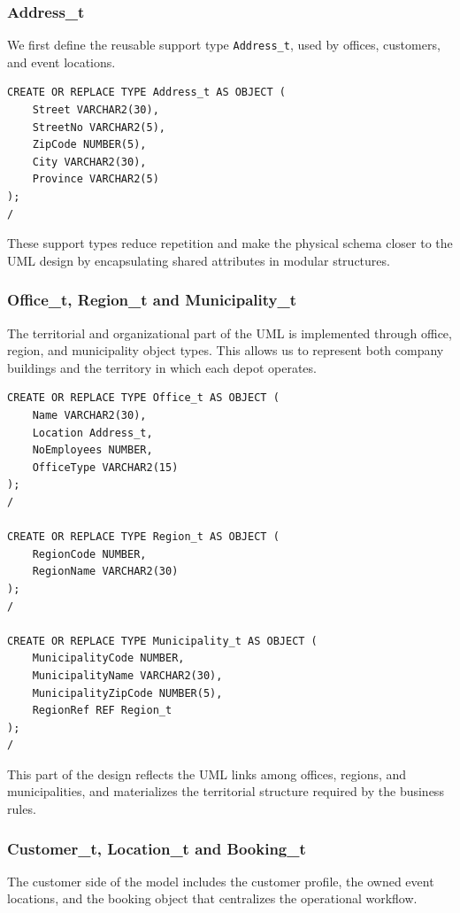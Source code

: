 \documentclass[12pt,a4paper]{article}
\begin{document}
\subsubsection*{Address\_t}
We first define the reusable support type \texttt{Address\_t}, used by offices, customers, and event locations.

\begin{verbatim}
CREATE OR REPLACE TYPE Address_t AS OBJECT (
    Street VARCHAR2(30),
    StreetNo VARCHAR2(5),
    ZipCode NUMBER(5),
    City VARCHAR2(30),
    Province VARCHAR2(5)
);
/
\end{verbatim}

These support types reduce repetition and make the physical schema closer to the UML design by encapsulating shared attributes in modular structures.

\subsubsection*{Office\_t, Region\_t and Municipality\_t}
The territorial and organizational part of the UML is implemented through office, region, and municipality object types. This allows us to represent both company buildings and the territory in which each depot operates.

\begin{verbatim}
CREATE OR REPLACE TYPE Office_t AS OBJECT (
    Name VARCHAR2(30),
    Location Address_t,
    NoEmployees NUMBER,
    OfficeType VARCHAR2(15)
);
/

CREATE OR REPLACE TYPE Region_t AS OBJECT (
    RegionCode NUMBER,
    RegionName VARCHAR2(30)
);
/

CREATE OR REPLACE TYPE Municipality_t AS OBJECT (
    MunicipalityCode NUMBER,
    MunicipalityName VARCHAR2(30),
    MunicipalityZipCode NUMBER(5),
    RegionRef REF Region_t
);
/
\end{verbatim}

This part of the design reflects the UML links among offices, regions, and municipalities, and materializes the territorial structure required by the business rules.

\subsubsection*{Customer\_t, Location\_t and Booking\_t}
The customer side of the model includes the customer profile, the owned event locations, and the booking object that centralizes the operational workflow.
\end{document}
